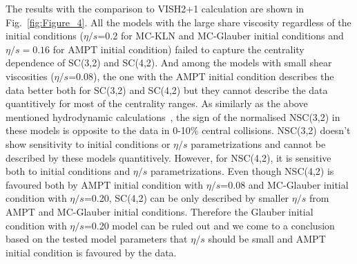 \documentclass[ALICE,manyauthors]{cernphprep}
\begin{document}
The results with the comparison to VISH2+1 calculation are shown in Fig.~\ref{fig:Figure_4}.  All the models with the large share viscosity regardless of the initial conditions ($\eta/s$=0.2 for MC-KLN and MC-Glauber initial conditions and $\eta/s = 0.16$ for AMPT initial condition) failed to capture the centrality dependence of SC(3,2) and SC(4,2). 
And among the models with small shear viscosities ($\eta/s$=0.08), the one with the AMPT initial condition describes the data better both for SC(3,2) and SC(4,2) but they cannot describe the data quantitively for most of the centrality ranges.
As similarly as the above mentioned hydrodynamic calculations~\cite{Niemi:2015qia}, the sign of the normalised NSC(3,2) in these models is opposite to the data in 0-10\% central collisions. NSC(3,2) doesn't show sensitivity to initial conditions or $\eta/s$ parametrizations and cannot be described by these models quantitively.
However, for NSC(4,2), it is sensitive both to initial conditions and $\eta/s$ parametrizations.
Even though NSC(4,2) is favoured both by AMPT initial condition with $\eta/s$=0.08 and MC-Glauber initial condition with $\eta/s$=0.20,
SC(4,2) can be only described by smaller $\eta/s$ from AMPT and MC-Glauber initial conditions. Therefore the Glauber initial condition with $\eta/s$=0.20 model can be ruled out and we come to a conclusion based on the tested model parameters that $\eta/s$ should be small and AMPT initial condition is favoured by the data.
\end{document}
